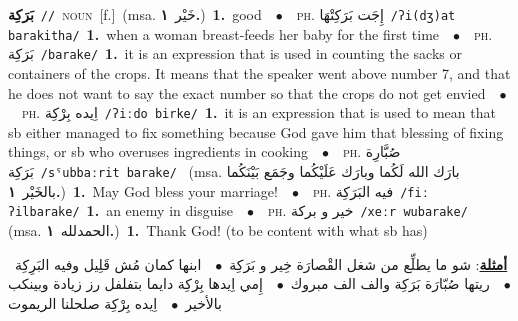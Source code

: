 \documentclass[10pt,a4paper,twoside]{article} %
\begin{document}
\begin{multicols}{2}
{\setlength\topsep{0pt}\textbf{\foreignlanguage{arabic}{بَرَكِة}}\ {\color{gray}\texttt{//}\color{black}}\ \textsc{noun}\ [f.]\ \color{gray}(msa. \foreignlanguage{arabic}{خَيْر}~\foreignlanguage{arabic}{\textbf{١.}})\color{black}\ \textbf{1.}~good\ \ $\bullet$\ \ \textsc{ph.} \color{gray} \foreignlanguage{arabic}{إِجَت بَرَكِتْهَا}\color{black}\ {\color{gray}\texttt{/{\sffamily ʔi(dʒ)at barakitha}/}\color{black}}\ \textbf{1.}~when a woman breast-feeds her baby for the first time\ \ $\bullet$\ \ \textsc{ph.} \color{gray} \foreignlanguage{arabic}{بَرَكِة}\color{black}\ {\color{gray}\texttt{/{\sffamily barake}/}\color{black}}\ \textbf{1.}~it is an expression that is used in counting the sacks or containers of the crops. It means that the speaker went above number 7, and that he does not want to say the exact number so that the crops do not get envied\ \ $\bullet$\ \ \textsc{ph.} \color{gray} \foreignlanguage{arabic}{اِيده بِرْكِة}\color{black}\ {\color{gray}\texttt{/{\sffamily ʔiːdo birke}/}\color{black}}\ \textbf{1.}~it is an expression that is used to mean that sb either managed to fix something because God gave him that blessing of fixing things, or sb who overuses ingredients in cooking\ \ $\bullet$\ \ \textsc{ph.} \color{gray} \foreignlanguage{arabic}{صُبَّارِة بَرَكِة}\color{black}\ {\color{gray}\texttt{/{\sffamily sˤubbaːrit barake}/}\color{black}}\ \color{gray} (msa. \foreignlanguage{arabic}{بارَك الله لَكُما وبارَك عَلَيْكُما وجَمَع بَيْنَكُما بالخَيْر}~\foreignlanguage{arabic}{\textbf{١.}})\color{black}\ \textbf{1.}~May God bless your marriage!\ \ $\bullet$\ \ \textsc{ph.} \color{gray} \foreignlanguage{arabic}{فيه البَرَكِة}\color{black}\ {\color{gray}\texttt{/{\sffamily fiː ʔilbarake}/}\color{black}}\ \textbf{1.}~an enemy in disguise\ \ $\bullet$\ \ \textsc{ph.} \color{gray} \foreignlanguage{arabic}{خير و بركة}\color{black}\ {\color{gray}\texttt{/{\sffamily xeːr wubarake}/}\color{black}}\ \color{gray} (msa. \foreignlanguage{arabic}{الحمدلله}~\foreignlanguage{arabic}{\textbf{١.}})\color{black}\ \textbf{1.}~Thank God! (to be content with what sb has)\  \begin{flushright}\color{gray}\foreignlanguage{arabic}{\textbf{\underline{\foreignlanguage{arabic}{أمثلة}}}: شو ما يطلِّع من شغل القْصارَة خِير و بَرَكِة\ $\bullet$\ \  ابنها كمان مُش قَلِيل وفيه البَرِكِة\ $\bullet$\ \  ريتها صُبّارَة بَرَكِة والف الف مبروك\ $\bullet$\ \  إِمي اِيدها بِرْكِة دايما بتفلفل رز زيادة وبينكب بالأخير\ $\bullet$\ \  اِيده بِرْكِة صلحلنا الريموت}\end{flushright}\color{black}} \vspace{2mm}


\end{multicols}
\end{document}
